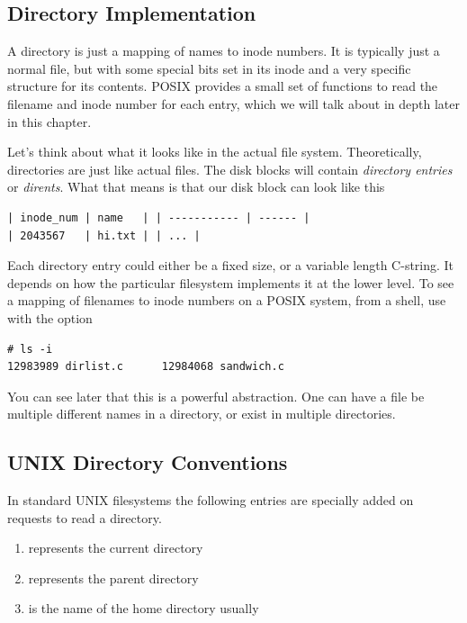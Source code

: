 \subsection{Directory Implementation}

A directory is just a mapping of names to inode numbers.
It is typically just a normal file, but with some special bits set in its inode and a very specific structure for its contents.
POSIX provides a small set of functions to read the filename and inode number for each entry, which we will talk about in depth later in this chapter.

Let's think about what it looks like in the actual file system.
Theoretically, directories are just like actual files.
The disk blocks will contain \emph{directory entries} or \emph{dirents}.
What that means is that our disk block can look like this

\begin{verbatim}
| inode_num | name   | | ----------- | ------ |
| 2043567   | hi.txt | | ... |
\end{verbatim}

Each directory entry could either be a fixed size, or a variable length C-string.
It depends on how the particular filesystem implements it at the lower level.
To see a mapping of filenames to inode numbers on a POSIX system, from a shell, use  with the  option

\begin{verbatim}
# ls -i
12983989 dirlist.c      12984068 sandwich.c
\end{verbatim}

You can see later that this is a powerful abstraction.
One can have a file be multiple different names in a directory, or exist in multiple directories.

\subsection{UNIX Directory Conventions}

In standard UNIX filesystems the following entries are specially added on requests to read a directory.

\begin{enumerate}
  \item {} represents the current directory
  \item {} represents the parent directory
  \item \keyword{~~} is the name of the home directory usually
\end{enumerate}

